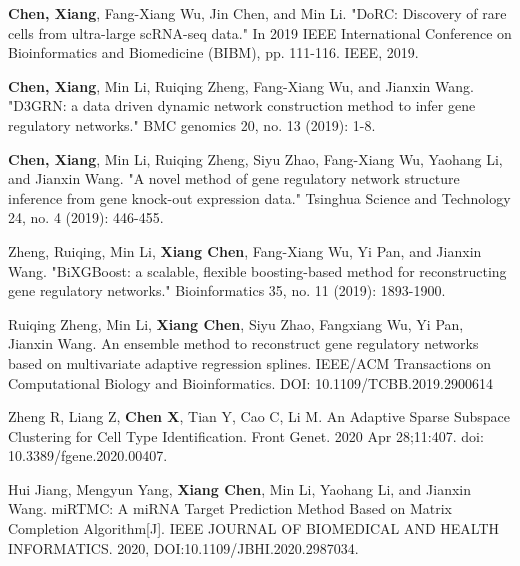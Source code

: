 \begin{enumerate}[label={[\arabic*]}]

\item \textbf{Chen, Xiang}, Fang-Xiang Wu, Jin Chen, and Min Li. "DoRC: Discovery of rare cells from ultra-large scRNA-seq data." In 2019 IEEE International Conference on Bioinformatics and Biomedicine (BIBM), pp. 111-116. IEEE, 2019.
\item \textbf{Chen, Xiang}, Min Li, Ruiqing Zheng, Fang-Xiang Wu, and Jianxin Wang. "D3GRN: a data driven dynamic network construction method to infer gene regulatory networks." BMC genomics 20, no. 13 (2019): 1-8.
\item \textbf{Chen, Xiang}, Min Li, Ruiqing Zheng, Siyu Zhao, Fang-Xiang Wu, Yaohang Li, and Jianxin Wang. "A novel method of gene regulatory network structure inference from gene knock-out expression data." Tsinghua Science and Technology 24, no. 4 (2019): 446-455.
\item Zheng, Ruiqing, Min Li, \textbf{Xiang Chen}, Fang-Xiang Wu, Yi Pan, and Jianxin Wang. "BiXGBoost: a scalable, flexible boosting-based method for reconstructing gene regulatory networks." Bioinformatics 35, no. 11 (2019): 1893-1900.
\item Ruiqing Zheng, Min Li, \textbf{Xiang Chen}, Siyu Zhao, Fangxiang Wu, Yi Pan, Jianxin Wang. An ensemble method to reconstruct gene regulatory networks based on multivariate adaptive regression splines. IEEE/ACM Transactions on Computational Biology and Bioinformatics. DOI: 10.1109/TCBB.2019.2900614
\item Zheng R, Liang Z, \textbf{Chen X}, Tian Y, Cao C, Li M. An Adaptive Sparse Subspace Clustering for Cell Type Identification. Front Genet. 2020 Apr 28;11:407. doi: 10.3389/fgene.2020.00407.
\item Hui Jiang, Mengyun Yang, \textbf{Xiang Chen}, Min Li, Yaohang Li, and Jianxin Wang. miRTMC: A miRNA Target Prediction Method Based on Matrix Completion Algorithm[J]. IEEE JOURNAL OF BIOMEDICAL AND HEALTH INFORMATICS. 2020, DOI:10.1109/JBHI.2020.2987034. 

\end{enumerate}
\fi

